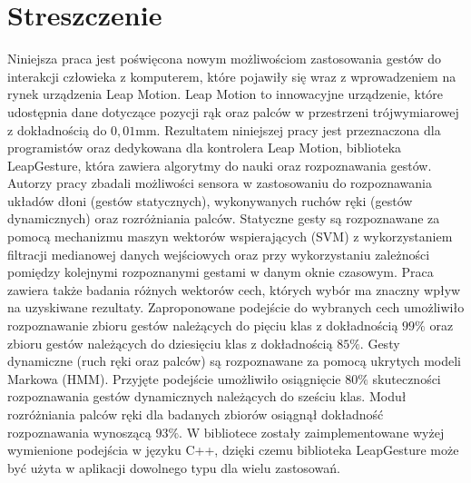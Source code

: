\chapter*{Streszczenie}
Niniejsza praca jest poświęcona nowym możliwościom zastosowania gestów do interakcji człowieka z komputerem, które pojawiły się wraz z wprowadzeniem na rynek urządzenia Leap Motion.
Leap Motion to innowacyjne urządzenie, które udostępnia dane dotyczące pozycji rąk oraz palców w przestrzeni trójwymiarowej z dokładnością do $0,01$mm.
Rezultatem niniejszej pracy jest przeznaczona dla programistów oraz dedykowana dla kontrolera Leap Motion, biblioteka LeapGesture, która zawiera algorytmy do nauki oraz rozpoznawania gestów.
Autorzy pracy zbadali możliwości sensora w zastosowaniu do rozpoznawania układów dłoni (gestów statycznych), wykonywanych ruchów ręki (gestów dynamicznych) oraz rozróżniania palców.
Statyczne gesty są rozpoznawane za pomocą mechanizmu maszyn wektorów wspierających (SVM) z wykorzystaniem filtracji medianowej danych wejściowych oraz przy wykorzystaniu zależności pomiędzy kolejnymi rozpoznanymi gestami w danym oknie czasowym.
Praca zawiera także badania różnych wektorów cech, których wybór ma znaczny wpływ na uzyskiwane rezultaty.
Zaproponowane podejście do wybranych cech umożliwiło rozpoznawanie zbioru gestów należących do pięciu klas z dokładnością $99\%$ oraz zbioru gestów należących do dziesięciu klas z dokładnością $85\%$.
Gesty dynamiczne (ruch ręki oraz palców) są rozpoznawane za pomocą ukrytych modeli Markowa (HMM).
Przyjęte podejście umożliwiło osiągnięcie $80\%$ skuteczności rozpoznawania gestów dynamicznych należących do sześciu klas.
Moduł rozróżniania palców ręki dla badanych zbiorów osiągnął dokładność rozpoznawania wynoszącą $93\%$. 
W bibliotece zostały zaimplementowane wyżej wymienione podejścia w języku C++, dzięki czemu biblioteka LeapGesture może być użyta w aplikacji dowolnego typu dla wielu zastosowań.

